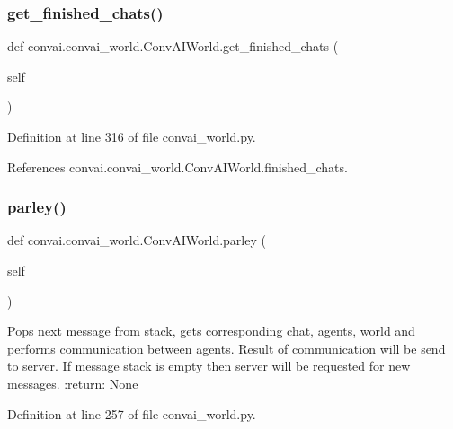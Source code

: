 \subsubsection{\texorpdfstring{get\+\_\+finished\+\_\+chats()}{get\_finished\_chats()}}
{\footnotesize\ttfamily def convai.\+convai\+\_\+world.\+Conv\+A\+I\+World.\+get\+\_\+finished\+\_\+chats (\begin{DoxyParamCaption}\item[{}]{self }\end{DoxyParamCaption})}



Definition at line 316 of file convai\+\_\+world.\+py.



References convai.\+convai\+\_\+world.\+Conv\+A\+I\+World.\+finished\+\_\+chats.

\mbox{\label{classconvai_1_1convai__world_1_1ConvAIWorld_a3cb70be6e7c878cf78041ed2722b9238}} 
\subsubsection{\texorpdfstring{parley()}{parley()}}
{\footnotesize\ttfamily def convai.\+convai\+\_\+world.\+Conv\+A\+I\+World.\+parley (\begin{DoxyParamCaption}\item[{}]{self }\end{DoxyParamCaption})}

\begin{DoxyVerb}Pops next message from stack, gets corresponding chat, agents, world
and performs communication between agents.
Result of communication will be send to server.
If message stack is empty then server will be requested for new messages.
:return: None
\end{DoxyVerb}
 

Definition at line 257 of file convai\+\_\+world.\+py.




